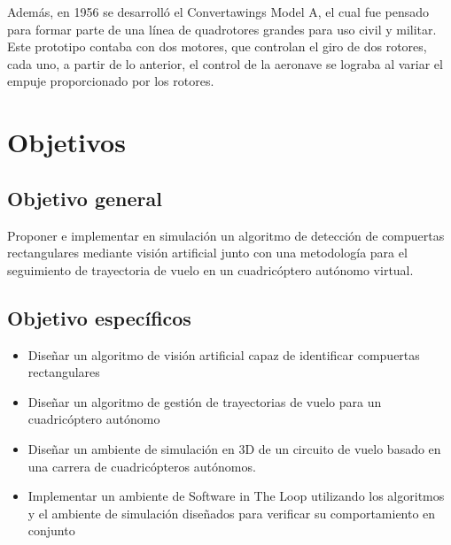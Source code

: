Además, en 1956 se desarrolló el Convertawings Model A, el cual fue pensado para formar parte de una línea de quadrotores grandes para uso civil y militar. Este prototipo contaba con dos motores, que controlan el giro de dos rotores, cada uno, a partir de lo anterior, el control de la aeronave se lograba al variar el empuje proporcionado por los rotores.





\section{Objetivos}
\subsection{Objetivo general}

Proponer e implementar en simulación un algoritmo de detección de compuertas rectangulares mediante visión artificial junto con una metodología para el seguimiento de trayectoria de vuelo en un cuadricóptero autónomo virtual.

\subsection{Objetivo específicos}

\begin{itemize}
    \item Diseñar un algoritmo de visión artificial capaz de identificar compuertas rectangulares 
    \item Diseñar un algoritmo de gestión de trayectorias de vuelo para un cuadricóptero autónomo 
    \item Diseñar un ambiente de simulación en 3D de un circuito de vuelo basado en una carrera de cuadricópteros autónomos. 
    \item Implementar un ambiente de Software in The Loop utilizando los algoritmos y el ambiente de simulación diseñados para verificar su comportamiento en conjunto 
\end{itemize}


